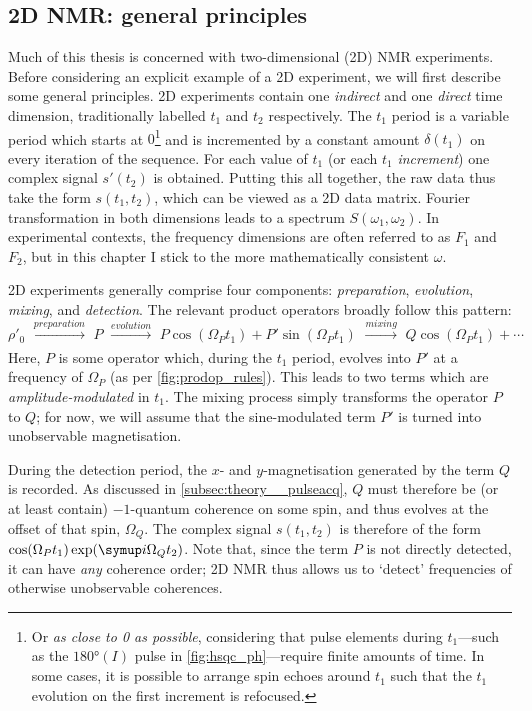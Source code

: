 \subsection{2D NMR: general principles}
\label{subsec:theory__2dnmr}

Much of this thesis is concerned with two-dimensional (2D) NMR experiments.
Before considering an explicit example of a 2D experiment, we will first describe some general principles.\autocite{Aue1976JCP_2D,Jeener2016PNMRS}
2D experiments contain one \textit{indirect} and one \textit{direct} time dimension, traditionally labelled $t_1$ and $t_2$ respectively.
The $t_1$ period is a variable period which starts at $0$\footnote{Or \textit{as close to 0 as possible}, considering that pulse elements during $t_1$---such as the $\ang{180}(I)$ pulse in \cref{fig:hsqc_ph}---require finite amounts of time. In some cases, it is possible to arrange spin echoes around $t_1$ such that the $t_1$ evolution on the first increment is refocused.} and is incremented by a constant amount $\delta(t_1)$ on every iteration of the sequence.
For each value of $t_1$ (or each $t_1$ \textit{increment}) one complex signal $s'(t_2)$ is obtained.
Putting this all together, the raw data thus take the form $s(t_1, t_2)$, which can be viewed as a 2D data matrix.
Fourier transformation in both dimensions leads to a spectrum $S(\omega_1, \omega_2)$.
In experimental contexts, the frequency dimensions are often referred to as $F_1$ and $F_2$, but in this chapter I stick to the more mathematically consistent $\omega$.

2D experiments generally comprise four components: \textit{preparation}, \textit{evolution}, \textit{mixing}, and \textit{detection}.
The relevant product operators broadly follow this pattern:
\begin{equation}
    \label{eq:2d_pemd}
    \rho'_0 \,\,\xrightarrow[]{\textit{preparation}} \,\, P \,\, \xrightarrow[]{\textit{evolution}} \,\, P\cos(\Omega_P t_1) + P'\sin(\Omega_P t_1) \,\, \xrightarrow[]{\textit{mixing}} \,\, Q\cos(\Omega_P t_1) + \cdots
\end{equation}
Here, $P$ is some operator which, during the $t_1$ period, evolves into $P'$ at a frequency of $\Omega_P$ (as per \cref{fig:prodop_rules}).
This leads to two terms which are \textit{amplitude-modulated} in $t_1$.
The mixing process simply transforms the operator $P$ to $Q$; for now, we will assume that the sine-modulated term $P'$ is turned into unobservable magnetisation.

During the detection period, the $x$- and $y$-magnetisation generated by the term $Q$ is recorded.
As discussed in \cref{subsec:theory__pulseacq}, $Q$ must therefore be (or at least contain) $-1$-quantum coherence on some spin, and thus evolves at the offset of that spin, $\Omega_Q$.
The complex signal $s(t_1, t_2)$ is therefore of the form $\cos(\Omega_P t_1)\exp(\mi \Omega_Q t_2)$.
Note that, since the term $P$ is not directly detected, it can have \textit{any} coherence order; 2D NMR thus allows us to `detect' frequencies of otherwise unobservable coherences.

